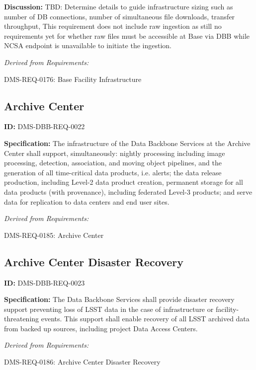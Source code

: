 \documentclass[SE,toc]{lsstdoc}
\begin{document}
\textbf{Discussion:}
TBD:  Determine details to guide infrastructure sizing such as number of DB connections, number of simultaneous file downloads, transfer throughput,    This requirement does not include raw ingestion as still no requirements yet for whether raw files must be accessible at Base via DBB while NCSA endpoint is unavailable to initiate the ingestion.

\emph{Derived from Requirements:}

DMS-REQ-0176:
Base Facility Infrastructure \newline

\subsection{Archive Center}

\label{DMS-DBB-REQ-0022}
\textbf{ID:} DMS-DBB-REQ-0022

\textbf{Specification:}
The infrastructure of the Data Backbone Services at the Archive Center shall support, simultaneously: nightly processing including image processing, detection, association, and moving object pipelines, and the generation of all time-critical data products, i.e. alerts; the data release production, including Level-2 data product creation, permanent storage for all data products (with provenance), including federated Level-3 products; and serve data for replication to data centers and end user sites.

\emph{Derived from Requirements:}

DMS-REQ-0185:
Archive Center \newline

\subsection{Archive Center Disaster Recovery}

\label{DMS-DBB-REQ-0023}
\textbf{ID:} DMS-DBB-REQ-0023

\textbf{Specification:}
The Data Backbone Services shall provide disaster recovery support preventing loss of LSST data in the case of infrastructure or facility-threatening events. This support shall enable recovery of all LSST archived data from backed up sources, including project Data Access Centers.

\emph{Derived from Requirements:}

DMS-REQ-0186:
Archive Center Disaster Recovery \newline
\end{document}
